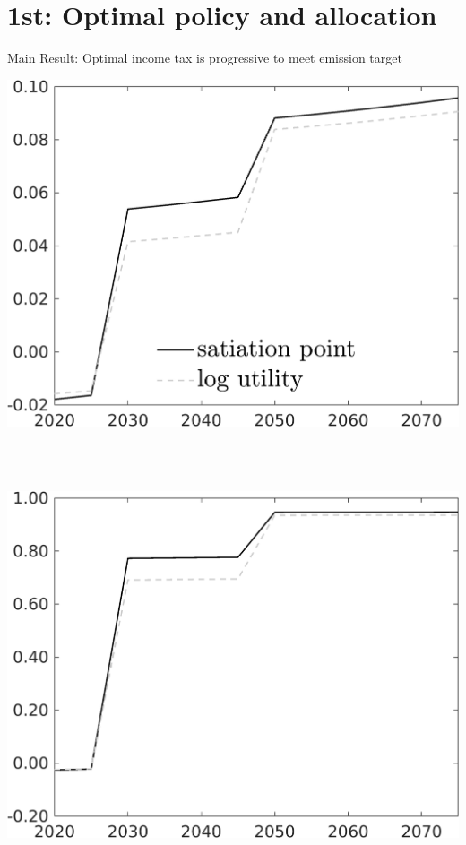 \documentclass[11pt,aspectratio=169]{beamer}
\begin{document}
\section*{1st: Optimal policy and allocation}
\begin{frame}{Main Result: Optimal income tax is progressive to meet emission target}
			\centering
	\begin{minipage}[]{0.32\textwidth}
\includegraphics[width=1\textwidth]{../codding_model/own_basedOnFried/optimalPol_elastS_DisuSci/figures/all_1705/Single_OPT_T_NoTaus_taul_spillover0_sep1_BNCOMP_ineq0_red0_etaa0.79_lgd1.png}
	\end{minipage}
\begin{minipage}[]{0.05\textwidth}
	\ \ \\ 
	\ \ 
\end{minipage}
	\begin{minipage}[]{0.32\textwidth}
	\includegraphics[width=1\textwidth]{../codding_model/own_basedOnFried/optimalPol_elastS_DisuSci/figures/all_1705/Single_OPT_T_NoTaus_tauf_spillover0_sep1_BNCOMP_ineq0_red0_etaa0.79_lgd0.png}
	\end{minipage}


\end{frame}
\end{document}
